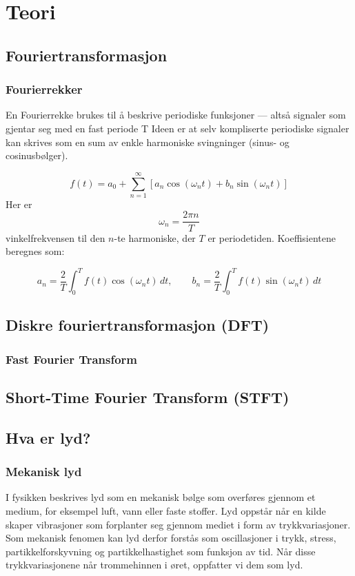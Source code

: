 \section{Teori}

\subsection{Fouriertransformasjon}

\subsubsection{Fourierrekker}
En Fourierrekke brukes til å beskrive periodiske funksjoner
— altså signaler som gjentar seg med en fast periode T
Ideen er at selv kompliserte periodiske signaler kan skrives 
som en sum av enkle harmoniske svingninger 
(sinus- og cosinusbølger). 

\[
f(t) = a_0 + \sum_{n=1}^{\infty} \left[ a_n \cos(\omega_n t) + b_n \sin(\omega_n t) \right]
\]
Her er 
\[
\omega_n = \frac{2\pi n}{T}
\]
vinkelfrekvensen til den $n$-te harmoniske, der $T$ er periodetiden. 
Koeffisientene beregnes som:

\[
a_n = \frac{2}{T} \int_{0}^{T} f(t)\cos(\omega_n t)\,dt, \qquad
b_n = \frac{2}{T} \int_{0}^{T} f(t)\sin(\omega_n t)\,dt
\]



\subsection{Diskre fouriertransformasjon (DFT)}

\subsubsection{Fast Fourier Transform}

\subsection{Short-Time Fourier Transform (STFT)}

\subsection{Hva er lyd?}

\subsubsection{Mekanisk lyd}
I fysikken beskrives lyd som en mekanisk bølge som overføres gjennom et medium, for eksempel luft, vann eller faste stoffer. 
Lyd oppstår når en kilde skaper vibrasjoner som forplanter seg gjennom mediet i form av trykkvariasjoner. 
Som mekanisk fenomen kan lyd derfor forstås som oscillasjoner i trykk, stress, partikkelforskyvning og partikkelhastighet som funksjon av tid. 
Når disse trykkvariasjonene når trommehinnen i øret, oppfatter vi dem som lyd.


